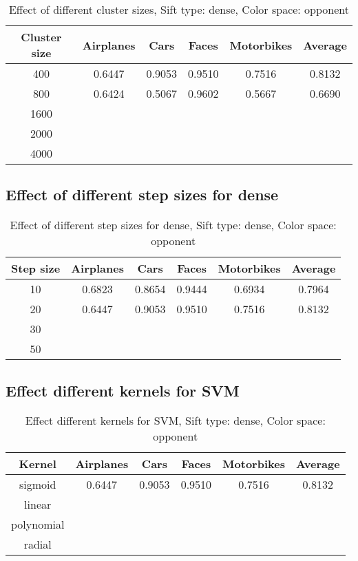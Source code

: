 \begin{table}[h]
\begin{tabular}{|c|ccccc|}
\hline
\textbf{Cluster size} & \textbf{Airplanes} & \textbf{Cars} & \textbf{Faces} & \textbf{Motorbikes} & \textbf{Average}\\
\hline
400 & 0.6447 & 0.9053 & 0.9510 & 0.7516 & 0.8132\\
800 & 0.6424 & 0.5067 & 0.9602 & 0.5667 & 0.6690\\
1600 & & & & & \\
2000 & & & & & \\
4000 & & & & & \\
\hline
\end{tabular}
\caption{Effect of different cluster sizes, Sift type: dense, Color space: opponent}
\end{table}

\subsection{Effect of different step sizes for dense}

\begin{table}[H]
\begin{tabular}{|c|ccccc|}
\hline
\textbf{Step size} & \textbf{Airplanes} & \textbf{Cars} & \textbf{Faces} & \textbf{Motorbikes} & \textbf{Average}\\
\hline
10 & 0.6823 & 0.8654 & 0.9444 & 0.6934 & 0.7964\\
20 & 0.6447 & 0.9053 & 0.9510 & 0.7516 & 0.8132\\
30 & & & & & \\
50 & & & & & \\
\hline
\end{tabular}
\caption{Effect of different step sizes for dense, Sift type: dense, Color space: opponent}
\end{table}


\subsection{Effect different kernels for SVM}

\begin{table}[H]
\begin{tabular}{|c|ccccc|}
\hline
\textbf{Kernel} & \textbf{Airplanes} & \textbf{Cars} & \textbf{Faces} & \textbf{Motorbikes} & \textbf{Average}\\
\hline
sigmoid & 0.6447 & 0.9053 & 0.9510 & 0.7516 & 0.8132\\
linear & & & & & \\
polynomial & & & & & \\
radial & & & & & \\
\hline
\end{tabular}
\caption{Effect different kernels for SVM, Sift type: dense, Color space: opponent}
\end{table}
